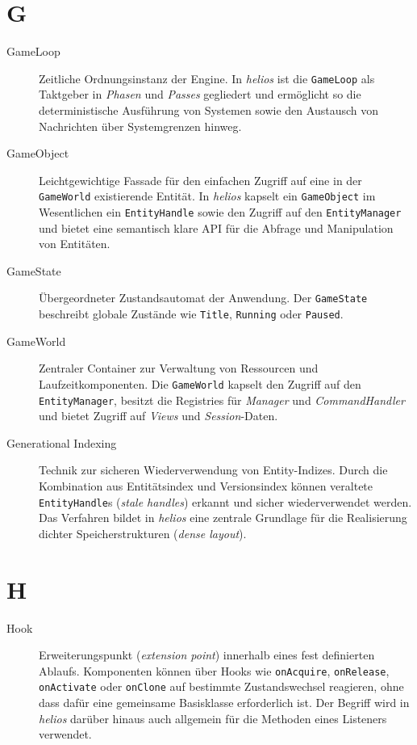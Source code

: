 \section*{G}

\begin{description}
    \item[GameLoop] Zeitliche Ordnungsinstanz der Engine.
    In \textit{helios} ist die \texttt{GameLoop} als Taktgeber in \textit{Phasen} und \textit{Passes} gegliedert und ermöglicht so die deterministische Ausführung von Systemen sowie den Austausch von Nachrichten über Systemgrenzen hinweg.

    \item[GameObject] Leichtgewichtige Fassade für den einfachen Zugriff auf eine in der \texttt{GameWorld} existierende Entität.
    In \textit{helios} kapselt ein \texttt{GameObject} im Wesentlichen ein \texttt{EntityHandle} sowie den Zugriff auf den \texttt{EntityManager} und bietet eine semantisch klare API für die Abfrage und Manipulation von Entitäten.

    \item[GameState] Übergeordneter Zustandsautomat der Anwendung.
    Der \texttt{GameState} beschreibt globale Zustände wie \texttt{Title}, \texttt{Running} oder \texttt{Paused}.

    \item[GameWorld] Zentraler Container zur Verwaltung von Ressourcen und Laufzeitkomponenten.
    Die \texttt{GameWorld} kapselt den Zugriff auf den \texttt{EntityManager}, besitzt die Registries für \textit{Manager} und \textit{CommandHandler} und bietet Zugriff auf \textit{Views} und \textit{Session}-Daten.

    \item[Generational Indexing] Technik zur sicheren Wiederverwendung von Entity-Indizes.
    Durch die Kombination aus Entitätsindex und Versionsindex können veraltete \texttt{EntityHandle}s (\textit{stale handles}) erkannt und sicher wiederverwendet werden.
    Das Verfahren bildet in \textit{helios} eine zentrale Grundlage für die Realisierung dichter Speicherstrukturen (\textit{dense layout}).
\end{description}

\section*{H}

\begin{description}
    \item[Hook] Erweiterungspunkt (\textit{extension point}) innerhalb eines fest definierten Ablaufs.
    Komponenten können über Hooks wie \texttt{onAcquire}, \texttt{onRelease}, \texttt{onActivate} oder \texttt{onClone} auf bestimmte Zustandswechsel reagieren, ohne dass dafür eine gemeinsame Basisklasse erforderlich ist.
    Der Begriff wird in \textit{helios} darüber hinaus auch allgemein für die Methoden eines Listeners verwendet.
\end{description}

